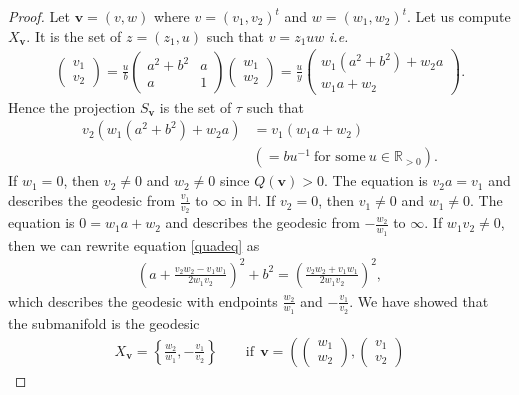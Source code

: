 \documentclass[a4paper,11pt]{amsart} %
\newcommand{\8}{\infty}
\newcommand{\vbf}{\mathbf{v}}
\newcommand{\HH}{\mathbb{H}}
\newcommand{\R}{\mathbb{R}}
\theoremstyle{mytheoremstyle}
\theoremstyle{remark}
\numberwithin{equation}{section}
\begin{document}
\begin{proof}
Let $\vbf=(v,w)$ where $v=(v_1,v_2)^t$ and $w=(w_1,w_2)^t$. Let us compute $X_{\vbf}$.
 It is the set of $z=(z_1,u)$ such that $v=z_1uw$ {\em i.e.}
 \begin{align}
     \begin{pmatrix}
         v_1 \\ v_2
     \end{pmatrix}= \frac{u}{b} \begin{pmatrix}
             a^2+b^2 & a \\ a & 1
         \end{pmatrix} \begin{pmatrix}
             w_1 \\ w_2
         \end{pmatrix}= \frac{u}{y}\begin{pmatrix}
             w_1(a^2+b^2)+w_2a \\ w_1a+w_2 
         \end{pmatrix}.
 \end{align}
 Hence the projection $S_{\vbf}$ is the set of $\tau$ such that
 \begin{align} \label{quadeq}
      v_2(w_1(a^2+b^2)+w_2a)&=v_1(w_1a+w_2) \\
      & (=bu^{-1} \ \textrm{for some} \ u \in \R_{>0} ). \nonumber
 \end{align}
 If $w_1=0$, then $v_2 \neq 0$ and $w_2 \neq 0$ since $Q(\vbf)>0$. The equation is $v_2a=v_1$ and describes the geodesic from $\frac{v_1}{v_2}$ to $\8$ in $\HH$. 
 If $v_2=0$, then $v_1 \neq 0$ and $w_1 \neq 0$. The equation is $0=w_1a+w_2$ and describes the geodesic from $-\frac{w_2}{w_1}$ to $\8$.
 If $w_1v_2 \neq 0$, then we can rewrite equation \eqref{quadeq} as
 \begin{align}
     \left ( a+\frac{v_2w_2-v_1w_1}{2w_1v_2} \right )^2+b^2=\left ( \frac{v_2w_2+v_1w_1}{2w_1v_2} \right )^2,
 \end{align}
which describes the geodesic with endpoints $\frac{w_2}{w_1}$ and $-\frac{v_1}{v_2}$. We have showed that the submanifold is the geodesic
    \begin{align}
      X_\vbf=\left \{ \frac{w_2}{w_1},-\frac{v_1}{v_2}\right \} \qquad  \textrm{if} \ \ \vbf =\left ( \begin{pmatrix}
          w_1 \\ w_2
      \end{pmatrix} ,\begin{pmatrix}
          v_1 \\ v_2

\end{pmatrix}
\end{align}
\end{proof}
\end{document}
